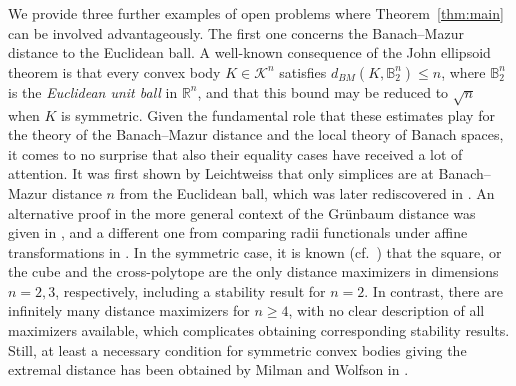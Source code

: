 \documentclass{amsart}
\newcommand{\cemph}[1]{\emph{\color{red}#1}}
\newcommand\R{\mathbb{R}}
\newcommand\B{\mathbb{B}}
\newcommand\CK{\mathcal{K}}
\begin{document}
We provide three
further examples of open problems where Theorem~\ref{thm:main} can be involved advantageously.
The first one concerns the Banach--Mazur distance to the Euclidean ball.
A well-known consequence of the John ellipsoid theorem \cite{1948:John} is that every convex body $K \in \CK^n$ satisfies $d_{BM}(K,\B_2^n) \leq n$,
where $\B_2^n$ is the \cemph{Euclidean unit ball} in $\R^n$,
and that this bound may be reduced to $\sqrt{n}$ when $K$ is symmetric.
Given the fundamental role that these estimates play
for the theory of the Banach--Mazur distance and the local theory of Banach spaces,
it comes to no surprise that also their equality cases have
received a lot of attention.
It was first shown by Leichtweiss \cite{1959:Leichtweiss} that only simplices are at Banach--Mazur distance $n$ from the Euclidean ball,
which was later rediscovered in \cite{1992:Palmon}.
An alternative proof
in the more general context of the Gr\"unbaum distance was given in \cite{2011:JimenezNaszodi},
and a different one from comparing radii functionals under affine transformations in \cite{2025:BrandenbergGrundbacher}.
In the symmetric case, it is known (cf.~\cite{2026:GrundbacherKobos}) that the square, or the cube and the cross-polytope are the only distance maximizers in dimensions $n = 2, 3$, respectively, including a stability result for $n = 2$.
In contrast, there are infinitely many distance maximizers for $n \geq 4$, with no clear description of all maximizers available, which complicates obtaining corresponding stability results.
Still, at least a
necessary condition for symmetric convex bodies giving the extremal distance has been obtained by Milman and Wolfson in \cite{1978:MilmanWolfson}.
\end{document}
